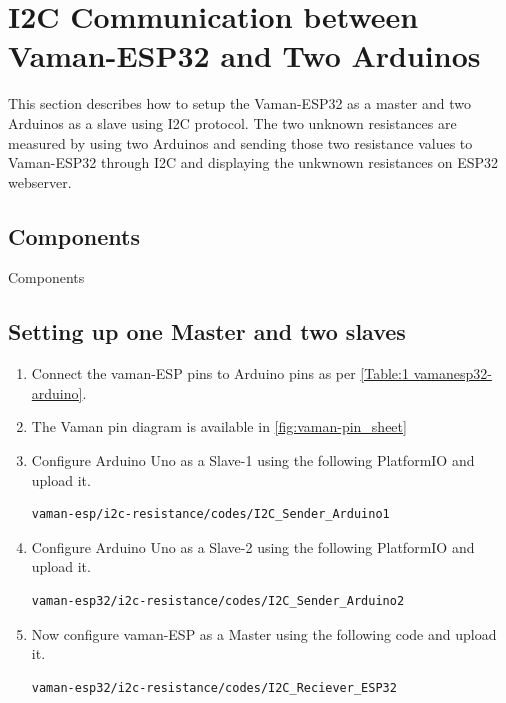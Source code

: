 \section{I2C Communication between Vaman-ESP32 and Two Arduinos}
This section describes how to setup the Vaman-ESP32 as a master and two Arduinos
as a slave using I2C protocol. The two unknown resistances are measured by using
two Arduinos and sending those two resistance values to Vaman-ESP32 through I2C
and displaying the unkwnown resistances on ESP32 webserver.
\subsection{Components}
\begin{table}[!ht]
\centering

\caption{Components}
\label{table:}
\end{table}
\subsection{Setting up one Master and two slaves}
\begin{enumerate}
\item
Connect the vaman-ESP pins to Arduino pins as per \autoref{Table:1
vamanesp32-arduino}.
\begin{table}[!ht]
\centering

\caption{}
\label{Table:1 vamanesp32-arduino}
\end{table}
\item The Vaman pin diagram is available in \autoref{fig:vaman-pin_sheet}
\item
Configure Arduino Uno as a Slave-1 using the following PlatformIO and upload it.
\begin{lstlisting}
vaman-esp/i2c-resistance/codes/I2C_Sender_Arduino1
\end{lstlisting}

\item
Configure Arduino Uno as a Slave-2 using the following PlatformIO and upload it.
\begin{lstlisting}
vaman-esp32/i2c-resistance/codes/I2C_Sender_Arduino2
\end{lstlisting}

\item
Now configure vaman-ESP as a Master using the following code and upload it.
\begin{lstlisting}
vaman-esp32/i2c-resistance/codes/I2C_Reciever_ESP32
\end{lstlisting}
\end{enumerate}
